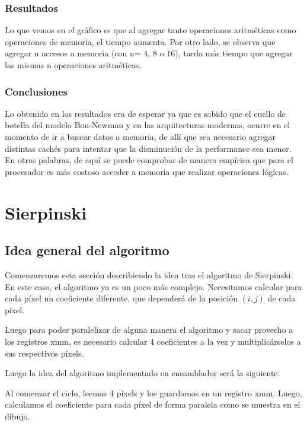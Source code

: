 \documentclass[a4paper]{article}
\begin{document}
\subsubsection{Resultados}
Lo que vemos en el gráfico es que al agregar tanto operaciones aritméticas como operaciones de memoria, el tiempo aumenta. Por otro lado, se observa que agregar n accesos a memoria (con n= $4$, $8$ o $16$), tarda más tiempo que agregar las mismas n operaciones aritméticas.

\subsubsection{Conclusiones}

Lo obtenido en los resultados era de esperar ya que es sabido que el cuello de botella del modelo Bon-Newman y en las arquitecturas modernas, ocurre en el momento de ir a buscar datos a memoria, de allí que sea necesario agregar distintas cachés para intentar que la disminución de la performance sea menor. En otras palabras, de aquí se puede comprobar de manera empírica que para el procesador es más costoso acceder a memoria que realizar operaciones lógicas. 

\newpage
\section{Sierpinski}

\subsection{Idea general del algoritmo}

Comenzaremos esta sección describiendo la idea tras el algoritmo de Sierpinski. En este caso, el algoritmo ya es un poco más complejo. Necesitamos calcular para cada píxel un coeficiente diferente, que dependerá de la posición $(i,j)$ de cada píxel.

Luego para poder paralelizar de alguna manera el algoritmo y sacar provecho a los registros xmm, es necesario calcular 4 coeficientes a la vez y multiplicárselos a sus respectivos píxels.

Luego la idea del algoritmo implementado en ensamblador será la siguiente:

Al comenzar el ciclo, leemos 4 píxels y los guardamos en un registro xmm. Luego, calculamos el coeficiente para cada píxel de forma paralela como se muestra en el dibujo.
\end{document}
